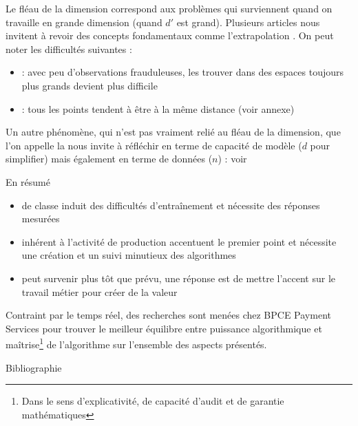 \documentclass{beamer}
\begin{document}
\begin{frame}{}{}
	Le fléau de la dimension correspond aux problèmes qui surviennent quand on travaille en grande dimension (quand $d'$ est grand). Plusieurs articles nous invitent à revoir des concepts fondamentaux comme l'extrapolation \cite{balestriero_highdimension}. On peut noter les difficultés suivantes :\newline
	\begin{itemize}
		\item {} : avec peu d'observations frauduleuses, les trouver dans des espaces toujours plus grands devient plus difficile
		\item {} : tous les points tendent à être à la même distance (voir annexe)\newline
	\end{itemize}
	
	Un autre phénomène, qui n'est pas vraiment relié au fléau de la dimension, que l'on appelle la  nous invite à réfléchir en terme de capacité de modèle ($d$ pour simplifier) mais également en terme de données ($n$) : voir \cite{nakkiran2019more}
\end{frame}


\begin{frame}{}{En résumé}
	\begin{itemize}
		\item {} de classe induit des difficultés d'entraînement et nécessite des réponses mesurées
		\item {} inhérent à l'activité de production accentuent le premier point et nécessite une création et un suivi minutieux des algorithmes
		\item {} peut survenir plus tôt que prévu, une réponse est de mettre l'accent sur le travail métier pour créer de la valeur\newline
	\end{itemize}
	
	Contraint par le temps réel, des recherches sont menées chez BPCE Payment Services pour trouver le meilleur équilibre entre puissance algorithmique et maîtrise\footnote{Dans le sens d'explicativité, de capacité d'audit et de garantie mathématiques} de l'algorithme sur l'ensemble des aspects présentés.
\end{frame}


\begin{frame}[allowframebreaks]{Bibliographie}
	
	
\end{frame}
\end{document}
